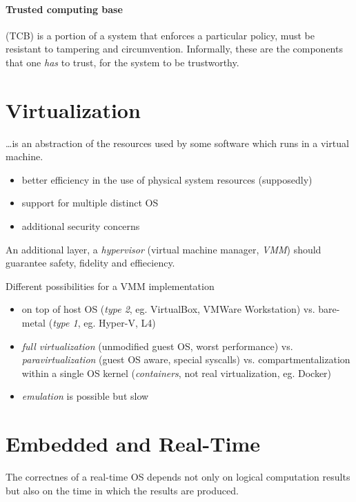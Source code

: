 \documentclass{article}
\begin{document}
\begin{multicols}{1}
\paragraph{Trusted computing base} (TCB) is a portion of a system that enforces a particular policy, must be resistant to tampering and circumvention. Informally, these are the components that one \emph{has} to trust, for the system to be trustworthy.

\section*{Virtualization}

\ldots is an abstraction of the resources used by some software which runs in a virtual machine.

\begin{itemize}
    \item better efficiency in the use of physical system resources (supposedly)
    \item support for multiple distinct OS
    \item additional security concerns
\end{itemize}

An additional layer, a \emph{hypervisor} (virtual machine manager, \emph{VMM}) should guarantee safety, fidelity and effieciency.

Different possibilities for a VMM implementation

\begin{itemize}
    \item on top of host OS (\emph{type 2}, eg. VirtualBox, VMWare Workstation) vs. bare-metal (\emph{type 1}, eg. Hyper-V, L4)
    \item \emph{full virtualization} (unmodified guest OS, worst performance) vs. \emph{paravirtualization} (guest OS aware, special syscalls) vs. compartmentalization within a single OS kernel (\emph{containers}, not real virtualization, eg. Docker)
    \item \emph{emulation} is possible but slow
\end{itemize}

\section*{Embedded and Real-Time}

The correctnes of a real-time OS depends not only on logical computation results but also on the time in which the results are produced.


\end{multicols}
\end{document}

